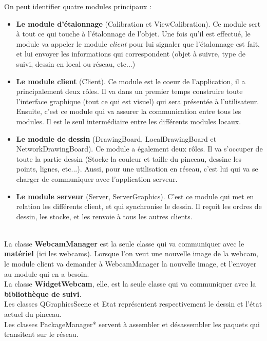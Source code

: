 \documentclass{report}
\begin{document}
				On peut identifier quatre modules principaux : \\
				\begin{itemize}
					\item \textbf{Le module d'étalonnage} (Calibration et ViewCalibration). Ce module sert à tout ce qui touche à l'étalonnage de l'objet. Une fois qu'il est effectué, le module va appeler le module \textit{client} pour lui signaler que l'étalonnage est fait, et lui envoyer les informations qui correspondent (objet à suivre, type de suivi, dessin en local ou réseau, etc...)
					\item \textbf{Le module client} (Client). Ce module est le coeur de l'application, il a principalement deux rôles. Il va dans un premier temps construire toute l'interface graphique (tout ce qui est visuel) qui sera présentée à l'utilisateur. Ensuite, c'est ce module qui va assurer la communication entre tous les modules. Il est le seul intermédiaire entre les différents modules locaux.
					\item \textbf{Le module de dessin} (DrawingBoard, LocalDrawingBoard et NetworkDrawingBoard). Ce module a également deux rôles. Il va s'occuper de toute la partie dessin (Stocke la couleur et taille du pinceau, dessine les points, lignes, etc...). Aussi, pour une utilisation en réseau, c'est lui qui va se charger de communiquer avec l'application serveur.
					\item \textbf{Le module serveur} (Server, ServerGraphics). C'est ce module qui met en relation les différents client, et qui synchronise le dessin. Il reçoit les ordres de dessin, les stocke, et les renvoie à tous les autres clients.
				\end{itemize}
				\ \\
				La classe \textbf{WebcamManager} est la seule classe qui va communiquer avec le \textbf{matériel} (ici les webcams). Lorsque l'on veut une nouvelle image de la webcam, le module client va demander à WebcamManager la nouvelle image, et l'envoyer au module qui en a besoin. \\
				La classe \textbf{WidgetWebcam}, elle, est la seule classe qui va communiquer avec la \textbf{bibliothèque de suivi}. \\
				Les classes QGraphicsScene et Etat représentent respectivement le dessin et l'état actuel du pinceau. \\
				Les classes PackageManager* servent à assembler et désassembler les paquets qui transitent sur le réseau.
				\newpage
\end{document}
